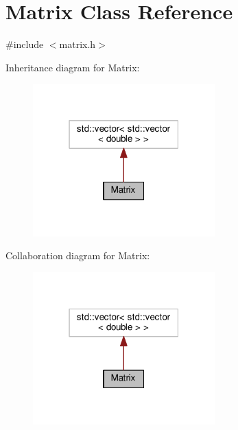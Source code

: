 \hypertarget{classMatrix}{}\section{Matrix Class Reference}
\label{classMatrix}


{\ttfamily \#include $<$matrix.\+h$>$}



Inheritance diagram for Matrix\+:
\nopagebreak
\begin{figure}[H]
\begin{center}
\leavevmode
\includegraphics[width=199pt]{classMatrix__inherit__graph}
\end{center}
\end{figure}


Collaboration diagram for Matrix\+:
\nopagebreak
\begin{figure}[H]
\begin{center}
\leavevmode
\includegraphics[width=199pt]{classMatrix__coll__graph}
\end{center}
\end{figure}
